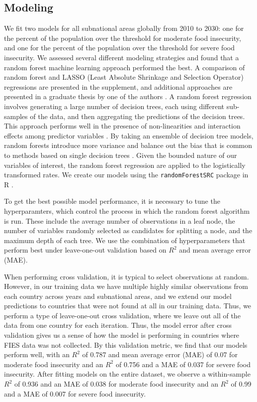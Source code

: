 \documentclass[titlepage]{article}
\begin{document}
\subsection{Modeling}
We fit two models for all subnational areas globally from 2010 to 2030: one for the percent of the population over the threshold for moderate food insecurity, and one for the percent of the population over the threshold for severe food insecurity.  We assessed several different modeling strategies and found that a random forest machine learning approach performed the best.  A comparison of random forest and LASSO (Least Absolute Shrinkage and Selection Operator) regressions are presented in the supplement, and additional approaches are presented in a graduate thesis by one of the authors \cite{muller2021}.   A random forest regression involves generating a large number of decision trees, each using different sub-samples of the data, and then aggregating the predictions of the decision trees.  This approach performs well in the presence of non-linearities and interaction effects among predictor variables \cite{hastie2009elements}.  By taking an ensemble of decision tree models, random forests introduce more variance and balance out the bias that is common to methods based on single decision trees \cite{friedman2001elements}. Given the bounded nature of our variables of interest, the random forest regression are applied to the logistically transformed rates.  We create our models using the \texttt{randomForestSRC} package in R \cite{ishwaran2019randomforestsrc}.

To get the best possible model performance, it is necessary to tune the hyperparamters, which control the process in which the random forest algorithm is run.  These include the average number of observations in a leaf node, the number of variables randomly selected as candidates for splitting a node, and the maximum depth of each tree.  We use the combination of hyperparameters that perform best under leave-one-out validation based on $R^2$ and mean average error (MAE).

When performing cross validation, it is typical to select observations at random.  However, in our training data we have multiple highly similar observations from each country across years and subnational areas, and we extend our model predictions to countries that were not found at all in our training data.  Thus, we perform a type of leave-one-out cross validation, where we leave out all of the data from one country for each iteration.  Thus, the model error after cross validation gives us a sense of how the model is performing in countries where FIES data was not collected.  By this validation metric, we find that our models perform well, with an $R^2$ of 0.787 and mean average error (MAE) of 0.07 for moderate food insecurity and an $R^2$ of 0.756 and a MAE of 0.037 for severe food insecurity.  After fitting models on the entire dataset, we observe a within-sample $R^2$ of 0.936 and an MAE of 0.038 for moderate food insecurity and an $R^2$ of 0.99 and a MAE of 0.007 for severe food insecurity.
\end{document}
